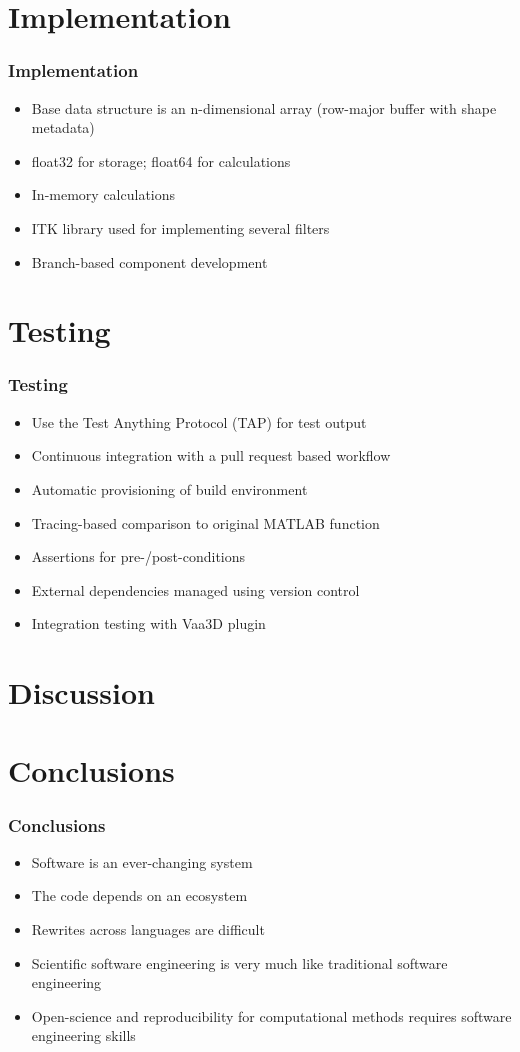 \documentclass[%
        hyperref={%
                pdfauthor={Zakariyya Mughal},%
                pdfpagemode={None},pdfpagelayout={SinglePage}},%
        xcolor={x11names}%
]{beamer}
\begin{document}
\section{Implementation}

\begin{frame}
\frametitle{Implementation}
\begin{itemize}
	\item Base data structure is an n-dimensional array (row-major buffer with shape metadata)
	\item float32 for storage; float64 for calculations
	\item In-memory calculations
	\item ITK library used for implementing several filters
	\item Branch-based component development
\end{itemize}
\end{frame}

\section{Testing}

\begin{frame}
\frametitle{Testing}
\begin{itemize}
	\item Use the Test Anything Protocol (TAP) for test output
	\item Continuous integration with a pull request based workflow
	\item Automatic provisioning of build environment
	\item Tracing-based comparison to original MATLAB function
	\item Assertions for pre-/post-conditions
	\item External dependencies managed using version control
	\item Integration testing with Vaa3D plugin
\end{itemize}
\end{frame}

\section{Discussion}

\section{Conclusions}

\begin{frame}
\frametitle{Conclusions}
\begin{itemize}
	\item Software is an ever-changing system
	\item The code depends on an ecosystem
	\item Rewrites across languages are difficult
	\item Scientific software engineering is very much like traditional software engineering
	\item Open-science and reproducibility for computational methods requires software engineering skills
\end{itemize}
\end{frame}
\end{document}
